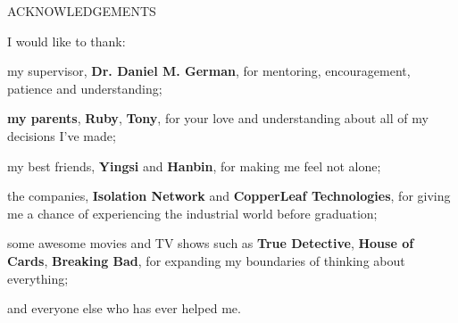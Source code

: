 \newpage
{}

\begin{center}
ACKNOWLEDGEMENTS
\end{center}

\noindent 
I would like to thank:

my supervisor, {\bf Dr. Daniel M. German}, for mentoring, encouragement, patience and understanding; 

{\bf my parents}, {\bf Ruby}, {\bf Tony}, for your love and understanding about all of my decisions I've made;

my best friends, {\bf Yingsi} and {\bf Hanbin}, for making me feel not alone; 

the companies, {\bf Isolation Network} and {\bf CopperLeaf Technologies}, for giving me a chance of experiencing the industrial world before graduation; 

some awesome movies and TV shows such as {\bf True Detective}, {\bf House of Cards}, {\bf Breaking Bad}, for expanding my boundaries of thinking about everything;

and everyone else who has ever helped me.